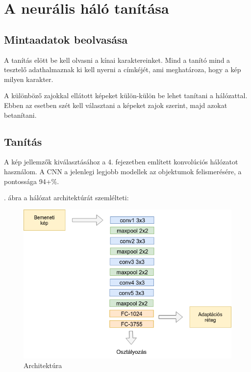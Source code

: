 \section{A neurális háló tanítása}

\subsection{Mintaadatok beolvasása}

A tanítás elött be kell olvasni a kínai karaktereinket. Mind a tanító mind a tesztelő adathalmaznak ki kell nyerni a címkéjét, ami meghatároza, hogy a kép milyen karakter.

A különböző zajokkal ellátott képeket külön-külön be lehet tanítani a hálózattal. Ebben az esetben szét kell választani a képeket zajok szerint, majd azokat betanítani.

\subsection{Tanítás}

A kép jellemzők kiválasztásához a 4. fejezetben említett konvolúciós hálózatot használom. A CNN a jelenlegi legjobb modellek az objektumok felismerésére, a pontossága 94+\%.

. ábra a hálózat architektúrát szemlélteti:

\begin{figure}[h]
	\centering
	\includegraphics[scale=0.45]{images/architecture}
	\caption{Architektúra}
	\label{fig:arch}
\end{figure}

